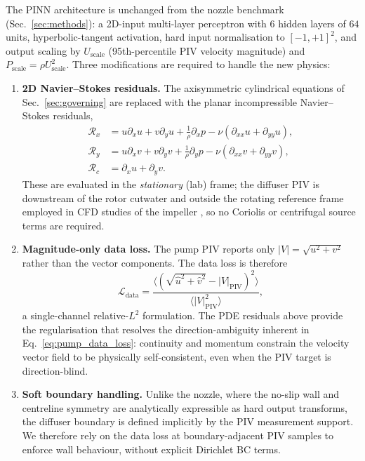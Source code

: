 \documentclass[12pt,a4paper]{article}
\begin{document}
The PINN architecture is unchanged from the nozzle benchmark
(Sec.~\ref{sec:methods}): a 2D-input multi-layer perceptron
with $6$ hidden layers of $64$ units, hyperbolic-tangent activation,
hard input normalisation to $[-1, +1]^2$, and output scaling by
$U_{\text{scale}}$ (95th-percentile PIV velocity magnitude) and
$P_{\text{scale}} = \rho U_{\text{scale}}^2$. Three modifications
are required to handle the new physics:

\begin{enumerate}[leftmargin=*, itemsep=2pt]
  \item \textbf{2D Navier--Stokes residuals.} The axisymmetric
    cylindrical equations of
    Sec.~\ref{sec:governing} are replaced with the
    planar incompressible Navier--Stokes residuals,
    \begin{align}
      \mathcal{R}_x &= u\partial_x u + v\partial_y u
                       + \tfrac{1}{\rho}\partial_x p
                       - \nu(\partial_{xx} u + \partial_{yy} u), \\
      \mathcal{R}_y &= u\partial_x v + v\partial_y v
                       + \tfrac{1}{\rho}\partial_y p
                       - \nu(\partial_{xx} v + \partial_{yy} v), \\
      \mathcal{R}_c &= \partial_x u + \partial_y v.
    \end{align}
    These are evaluated in the \emph{stationary} (lab) frame; the
    diffuser PIV is downstream of the rotor cutwater and outside
    the rotating reference frame employed in CFD studies of the
    impeller \cite{Ponnaluri2023PumpCFD}, so no Coriolis or
    centrifugal source terms are required.

  \item \textbf{Magnitude-only data loss.} The pump PIV reports only
    $|V| = \sqrt{u^2 + v^2}$ rather than the vector components.
    The data loss is therefore
    \begin{equation}
      \mathcal{L}_{\text{data}}
      = \frac{\langle (\sqrt{\hat{u}^2 + \hat{v}^2} - |V|_{\text{PIV}})^2 \rangle}
             {\langle |V|_{\text{PIV}}^2 \rangle},
      \label{eq:pump_data_loss}
    \end{equation}
    a single-channel relative-$L^2$ formulation. The PDE residuals
    above provide the regularisation that resolves the
    direction-ambiguity inherent in
    Eq.~\eqref{eq:pump_data_loss}: continuity and momentum
    constrain the velocity vector field to be physically
    self-consistent, even when the PIV target is direction-blind.

  \item \textbf{Soft boundary handling.} Unlike the nozzle, where
    the no-slip wall and centreline symmetry are analytically
    expressible as hard output transforms, the diffuser boundary
    is defined implicitly by the PIV measurement support. We
    therefore rely on the data loss at boundary-adjacent PIV
    samples to enforce wall behaviour, without explicit
    Dirichlet BC terms.
\end{enumerate}
\end{document}
